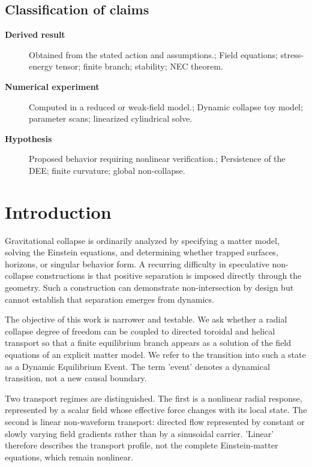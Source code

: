 \documentclass[aps,prd,preprint,nofootinbib,superscriptaddress]{revtex4-2}
\begin{document}
\subsection{Classification of claims}

\begin{description}
\item[\textbf{Derived result}] Obtained from the stated action and assumptions.; Field equations; stress-energy tensor; finite branch; stability; NEC theorem.
\item[\textbf{Numerical experiment}] Computed in a reduced or weak-field model.; Dynamic collapse toy model; parameter scans; linearized cylindrical solve.
\item[\textbf{Hypothesis}] Proposed behavior requiring nonlinear verification.; Persistence of the DEE; finite curvature; global non-collapse.
\end{description}

\section{Introduction}

Gravitational collapse is ordinarily analyzed by specifying a matter model, solving the Einstein equations, and determining whether trapped surfaces, horizons, or singular behavior form. A recurring difficulty in speculative non-collapse constructions is that positive separation is imposed directly through the geometry. Such a construction can demonstrate non-intersection by design but cannot establish that separation emerges from dynamics.


The objective of this work is narrower and testable. We ask whether a radial collapse degree of freedom can be coupled to directed toroidal and helical transport so that a finite equilibrium branch appears as a solution of the field equations of an explicit matter model. We refer to the transition into such a state as a Dynamic Equilibrium Event. The term 'event' denotes a dynamical transition, not a new causal boundary.


Two transport regimes are distinguished. The first is a nonlinear radial response, represented by a scalar field whose effective force changes with its local state. The second is linear non-waveform transport: directed flow represented by constant or slowly varying field gradients rather than by a sinusoidal carrier. 'Linear' therefore describes the transport profile, not the complete Einstein-matter equations, which remain nonlinear.
\end{document}

